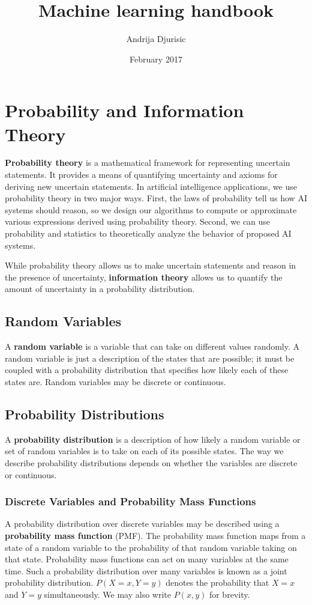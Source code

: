 \documentclass{article}
\title{Machine learning handbook}
\author{Andrija Djurisic}
\date{February 2017}
\begin{document}
   \maketitle
\section{Probability and Information Theory}

\textbf{Probability theory} is a mathematical framework for representing uncertain
statements. It provides a means of quantifying uncertainty and axioms for deriving
new uncertain statements. In artificial intelligence applications, we use probability
theory in two major ways. First, the laws of probability tell us how AI systems
should reason, so we design our algorithms to compute or approximate various
expressions derived using probability theory. Second, we can use probability and
statistics to theoretically analyze the behavior of proposed AI systems.

While probability theory allows us to make uncertain statements and reason
in the presence of uncertainty, \textbf{information theory} allows us to quantify the amount of
uncertainty in a probability distribution.

\subsection{Random Variables}
A \textbf{random variable} is a variable that can take on different values randomly. A random variable is just a description of the states that are possible; it must be coupled with a probability distribution that specifies how likely each of these states are. Random variables may be discrete or continuous.

\subsection{Probability Distributions}
A \textbf{probability distribution} is a description of how likely a random variable or
set of random variables is to take on each of its possible states. The way we
describe probability distributions depends on whether the variables are discrete or
continuous.

\subsubsection{Discrete Variables and Probability Mass Functions}
A probability distribution over discrete variables may be described using a \textbf{probability
mass function} (PMF). The probability mass function maps from a state of a random variable to
the probability of that random variable taking on that state. Probability mass functions can act on many variables at the same time. Such a probability distribution over many variables is known as a joint probability distribution. $P(X = x, Y = y)$ denotes the probability that $X = x$ and $Y = y$
simultaneously. We may also write $P(x, y)$ for brevity.
\end{document}
